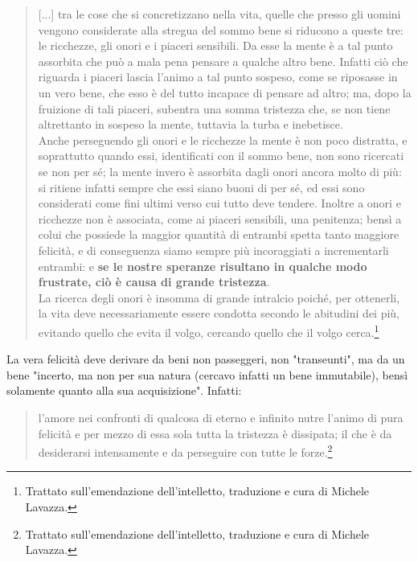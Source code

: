 \begin{quotation}
	\small [...] tra le cose che si concretizzano nella vita, quelle che presso gli uomini vengono
	considerate alla stregua del sommo bene si riducono a queste tre: le ricchezze, gli onori e i piaceri
	sensibili. Da esse la mente è a tal punto assorbita che può a mala pena pensare a qualche altro bene. Infatti ciò che riguarda i piaceri lascia l'animo a tal punto sospeso, come se riposasse in un vero
	bene, che esso è del tutto incapace di pensare ad altro; ma, dopo la fruizione di tali piaceri, subentra
	una somma tristezza che, se non tiene altrettanto in sospeso la mente, tuttavia la turba e inebetisce.\\
	Anche perseguendo gli onori e le ricchezze la mente è non poco distratta, e soprattutto
	quando essi, identificati con il sommo bene, non sono ricercati se non per sé; la mente invero è
	assorbita dagli onori ancora molto di più: si ritiene infatti sempre che essi siano buoni di per sé, ed
	essi sono considerati come fini ultimi verso cui tutto deve tendere. Inoltre a onori e ricchezze non è
	associata, come ai piaceri sensibili, una penitenza; bensì a colui che possiede la maggior quantità di
	entrambi spetta tanto maggiore felicità, e di conseguenza siamo sempre più incoraggiati a
	incrementarli entrambi: e \textbf{se le nostre speranze risultano in qualche modo frustrate, ciò è causa di
	grande tristezza}.\\
	La ricerca degli onori è insomma di grande intralcio poiché, per ottenerli, la vita deve necessariamente essere condotta secondo le abitudini dei più, evitando quello che evita il volgo,
	cercando quello che il volgo cerca.\footnote{Trattato sull'emendazione dell'intelletto, traduzione e cura di Michele Lavazza.}
\end{quotation}

La vera felicità deve derivare da beni non passeggeri, non "transeunti", ma da un bene "incerto, ma non per sua natura (cercavo infatti
un bene immutabile), bensì solamente quanto alla sua acquisizione". Infatti: 

\begin{quotation}
	\small l'amore nei confronti di qualcosa di eterno e infinito nutre l'animo di pura felicità e per mezzo di
	essa sola tutta la tristezza è dissipata; il che è da desiderarsi intensamente e da perseguire con tutte
	le forze.\footnote{Trattato sull'emendazione dell'intelletto, traduzione e cura di Michele Lavazza.}
\end{quotation}

